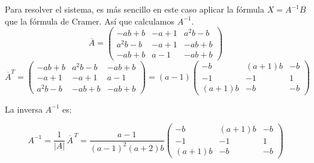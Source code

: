 \documentclass[a4paper,12pt]{article}
\begin{document}
\begin{ejercicio}[title=Ejercicio 31]
\begin{itemize}
Para resolver el sistema, es más sencillo en este caso aplicar la fórmula ${X} = {A}^{-1} {B}$ que la fórmula de Cramer. Así que calculamos $A^{-1}$.
$$\overline{A} =
\begin{pmatrix}
-ab+b & -a+1 & a^2b-b\\
a^2b-b & -a+1 & -ab+b\\
-ab+b & a-1 & -ab+b
\end{pmatrix}$$
$$\overline{{A}}^T =
\begin{pmatrix}
-ab+b & a^2b-b & -ab+b\\
-a+1 & -a+1 & a-1\\
a^2b-b & -ab+b & -ab+b
\end{pmatrix} = (a-1)
\begin{pmatrix}
-b & (a+1)b & -b\\
-1 & -1 & 1\\
(a+1)b & -b & -b
\end{pmatrix}$$
\[\]

La inversa $A^{-1}$ es:

\[
A^{-1}
= \frac{1}{|A|}\,\overline{A}^{\,T}
= \frac{a-1}{(a-1)^2(a+2)b}
\begin{pmatrix}
-b & (a+1)b & -b\\
-1 & -1 & 1\\
(a+1)b & -b & -b
\end{pmatrix}
\]
\end{itemize}
\end{ejercicio}
\end{document}
